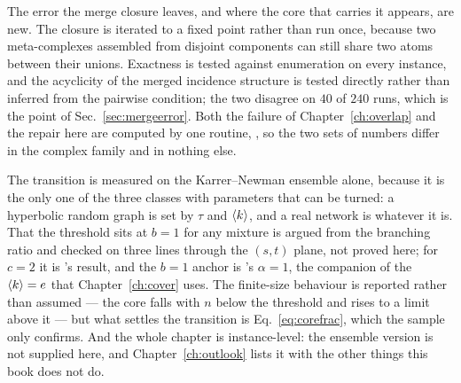 The error the merge closure leaves, and where the core that carries it appears,
are new. The closure is iterated to a fixed point rather than run once, because
two meta-complexes assembled from disjoint components can still share two atoms
between their unions. Exactness is tested against enumeration on every instance,
and the acyclicity of the merged incidence structure is tested directly rather
than inferred from the pairwise condition; the two disagree on $40$ of $240$
runs, which is the point of Sec.~\ref{sec:mergeerror}. Both the failure of
Chapter~\ref{ch:overlap} and the repair here are computed by one routine,
, so the two sets of numbers differ in the complex family and
in nothing else.

The transition is measured on the Karrer--Newman ensemble alone, because it is
the only one of the three classes with parameters that can be turned: a
hyperbolic random graph is set by $\tau$ and $\langle k \rangle$, and a real network is
whatever it is. That the threshold sits at $b=1$ for any mixture is argued from
the branching ratio and checked on three lines through the $(s,t)$ plane, not
proved here; for $c=2$ it is \citeauthor{pittel1996}'s result, and the $b=1$
anchor is \citeauthor{bauer2001}'s $\alpha=1$, the companion of the $\langle k \rangle=e$
that Chapter~\ref{ch:cover} uses. The finite-size behaviour is reported rather than assumed --- the core falls
with $n$ below the threshold and rises to a limit above it --- but what settles
the transition is Eq.~\eqref{eq:corefrac}, which the sample only confirms. And the whole chapter is instance-level:
the ensemble version is not supplied here, and Chapter~\ref{ch:outlook} lists it
with the other things this book does not do.
